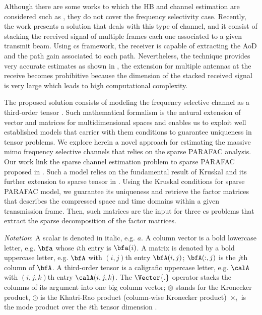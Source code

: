 \documentclass[conference]{IEEEtran}
\begin{document}
Although there are some works to which the \gls{HB} and channel estimation are considered such as
\cite{Heath:2016,Alkhateeb:2014}, they do not cover the frequency selectivity
case. Recently, the work \cite{Venugopal:2017} presents a solution that deals
with this type of channel, and it consist of stacking the received signal of
multiple frames each one associated to a given transmit beam. Using \gls{cs}
framework, the receiver is capable of extracting the \gls{AoD} and the path gain
associated to each path. Nevertheless, the technique provides very accurate
estimates as shown in \cite{Venugopal:2017},  the extension for 
multiple antennas at the receive becomes prohibitive because the dimension of the
stacked received signal is very large which leads to high computational complexity.

The proposed solution consists of modeling the frequency selective channel as a
third-order tensor \cite{Kolda:2009,Sidiropoulos:2000}. Such mathematical
formalism is the natural extension of vector and matrices for multidimensional
spaces and enables us to exploit well established models that carrier
with them conditions to guarantee uniqueness in tensor problems. We explore
herein a novel approach for estimating the massive \gls{mimo} frequency
selective channels that relies on the sparse \gls{PARAFAC} analysis. Our work
link the sparse channel estimation problem to sparse \gls{PARAFAC} proposed in
\cite{Sidiropoulos:2012}. Such a model relies on the fundamental result of
Kruskal \cite{Sidiropoulos:2000} and its further extension to sparse tensor in
\cite{Sidiropoulos:2012}. Using the Kruskal conditions for sparse \gls{PARAFAC}
model, we guarantee its uniqueness and retrieve the factor matrices
\cite{Kolda:2009} that
describes the compressed space and time domains within a given transmission
frame. Then, such matrices are the input for three \gls{cs} problems that
extract  the sparse decomposition of the factor matrices.


\textit{Notation}: A scalar is denoted in italic, e.g. $a$. A column vector is a
bold lowercase letter, e.g. $\bfa$ whose $i$th entry is $\bfa(i)$. A matrix is
denoted by a bold uppercase letter, e.g. $\bfA$ with $(i,j)$th entry
$\bfA(i,j)$; $\bfA(:,j)$ is the $j$th column of $\bfA$. A third-order tensor is
a caligrafic uppercase letter, e.g. $\calA$ with $(i,j,k)$th entry
$\calA(i,j,k)$. The $\Vector{.}$ operator stacks the columns of its argument
into one big column  vector; $\otimes$ stands for the Kronecker product,
$\odot$ is the Khatri-Rao product (column-wise Kronecker product)
$\times _i $ is the mode product over the $i$th tensor dimension  \cite{Sidiropoulos:2000,Kolda:2009}.
\end{document}
